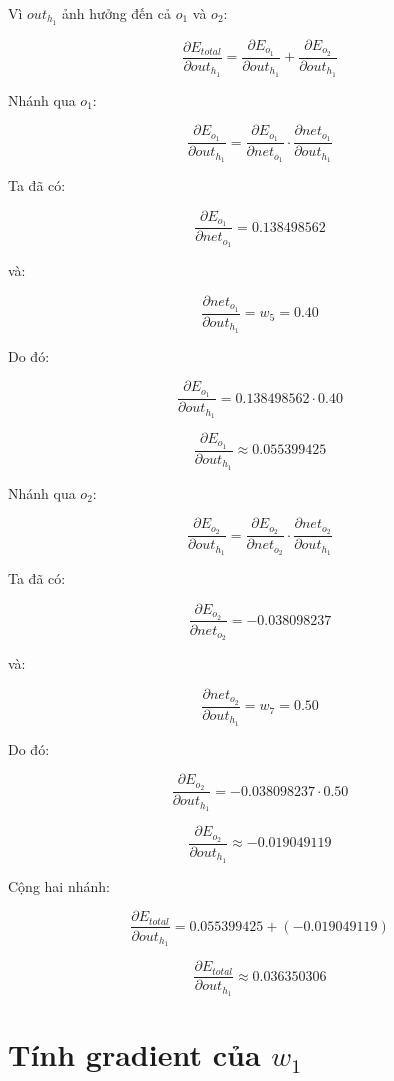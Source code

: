 \documentclass[12pt,a4paper]{report}
\begin{document}
Vì $out_{h_1}$ ảnh hưởng đến cả $o_1$ và $o_2$:

\[
    \frac{\partial E_{total}}{\partial out_{h_1}}
    =
    \frac{\partial E_{o_1}}{\partial out_{h_1}}
    +
    \frac{\partial E_{o_2}}{\partial out_{h_1}}
\]

Nhánh qua $o_1$:

\[
    \frac{\partial E_{o_1}}{\partial out_{h_1}}
    =
    \frac{\partial E_{o_1}}{\partial net_{o_1}}
    \cdot
    \frac{\partial net_{o_1}}{\partial out_{h_1}}
\]

Ta đã có:

\[
    \frac{\partial E_{o_1}}{\partial net_{o_1}}
    =
    0.138498562
\]

và:

\[
    \frac{\partial net_{o_1}}{\partial out_{h_1}}
    =
    w_5
    =
    0.40
\]

Do đó:

\[
    \frac{\partial E_{o_1}}{\partial out_{h_1}}
    =
    0.138498562\cdot 0.40
\]

\[
    \frac{\partial E_{o_1}}{\partial out_{h_1}}
    \approx 0.055399425
\]

Nhánh qua $o_2$:

\[
    \frac{\partial E_{o_2}}{\partial out_{h_1}}
    =
    \frac{\partial E_{o_2}}{\partial net_{o_2}}
    \cdot
    \frac{\partial net_{o_2}}{\partial out_{h_1}}
\]

Ta đã có:

\[
    \frac{\partial E_{o_2}}{\partial net_{o_2}}
    =
    -0.038098237
\]

và:

\[
    \frac{\partial net_{o_2}}{\partial out_{h_1}}
    =
    w_7
    =
    0.50
\]

Do đó:

\[
    \frac{\partial E_{o_2}}{\partial out_{h_1}}
    =
    -0.038098237\cdot 0.50
\]

\[
    \frac{\partial E_{o_2}}{\partial out_{h_1}}
    \approx -0.019049119
\]

Cộng hai nhánh:

\[
    \frac{\partial E_{total}}{\partial out_{h_1}}
    =
    0.055399425
    +
    (-0.019049119)
\]

\[
    \frac{\partial E_{total}}{\partial out_{h_1}}
    \approx 0.036350306
\]

\section{Tính gradient của $w_1$}
\end{document}
